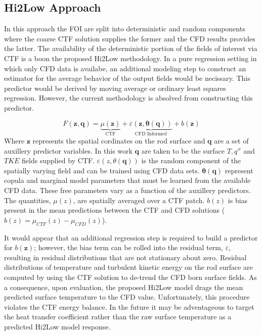 \subsection{Hi2Low Approach}

In this approach the FOI are split into deterministic and random components where the coarse CTF solution supplies the former and the CFD results provides the latter.
The availability of the deterministic portion of the fields of interest via CTF is a boon the proposed Hi2Low methodology.  In a pure regression setting in which only CFD data is availabe, an additional modeling step to construct an estimator for the average behavior of the output fields would be necissary.  This predictor would be derived by moving average or ordinary least squares regression.  However, the current methodology is absolved from constructing this predictor.

\begin{equation}
    F(\mathbf z, \mathbf q) = \underbrace{\mu(\mathbf{z})}_\text{CTF} + \underbrace{\varepsilon({\mathbf z, \mathbf \theta(\mathbf q)})}_\text{CFD Informed} + b(\mathbf{z})
\end{equation}
Where $\mathbf z$ represents the spatial cordinates on the rod surface and $\mathbf q$ are a set of auxillery predictor variables.  In this work $\mathbf q$ are taken to be the surface $T, q''$ and $TKE$ fields supplied by CTF. $\varepsilon(z, \theta(\mathbf q))$ is the random component of the spatially varying field and can be trained using CFD data sets.  $\mathbf \theta(\mathbf q)$ represent copula and marginal model parameters that must be learned from the available CFD data.  These free parameters vary as a function of the auxillery predictors.
 The quantities, $\mu(z)$, are spatially averaged over a CTF patch.
$b(z)$ is bias present in the mean predictions between the CTF and CFD solutions ($b(z) = \mu_{CTF}(z) - \mu_{CFD}(z)$).

It would appear that an additional regression step is required to build a predictor for $b(\mathbf{z})$; however, the bias term can be rolled into the residual term, $\varepsilon$, resulting in residual distributions that are not stationary about zero.
Residual distributions of temperature and turbulent kinetic energy on the rod surface are computed by using the CTF solution to de-trend the CFD born surface fields.  As a consequence, upon evaluation, the proposed Hi2Low model drags the mean predicted surface temperature to the CFD value.  Unfortunately, this procedure violates the CTF energy balance.  In the future it may be adventageous to target the heat transfer coefficient rather than the raw surface temperature as a predicted Hi2Low model response.

